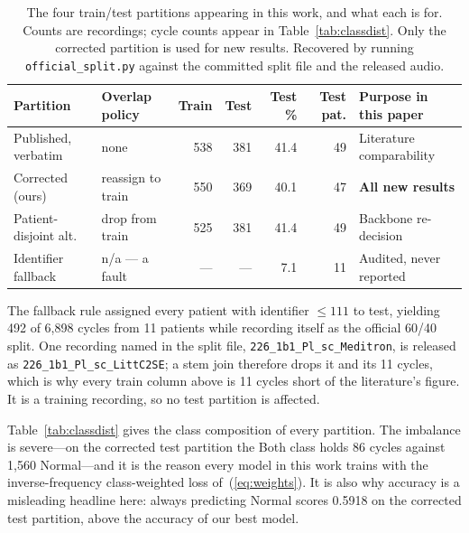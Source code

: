 \documentclass[journal,onecolumn]{IEEEtran}
\newcommand{\best}[1]{\textbf{#1}}
\begin{document}
\begin{table}[!t]
\centering
\caption{The four train/test partitions appearing in this work, and what each is
for. Counts are recordings; cycle counts appear in Table~\ref{tab:classdist}.
Only the corrected partition is used for new results. Recovered by running
\texttt{official\_split.py} against the committed split file and the released
audio.}
\label{tab:splits}
\small
\begin{tabular}{llrrrrl}
\toprule
Partition & Overlap policy & Train & Test & Test \% & Test pat. & Purpose in this paper \\
\midrule
Published, verbatim   & none                 & 538 & 381 & 41.4 & 49 & Literature comparability \\
Corrected (ours)      & reassign to train    & 550 & 369 & 40.1 & 47 & \best{All new results} \\
Patient-disjoint alt. & drop from train      & 525 & 381 & 41.4 & 49 & Backbone re-decision \\
Identifier fallback   & n/a --- a fault      & --- & --- & \phantom{0}7.1 & 11 & Audited, never reported \\
\bottomrule
\end{tabular}

\vspace{2pt}
\footnotesize The fallback rule assigned every patient with identifier
$\leq111$ to test, yielding 492 of 6{,}898 cycles from 11 patients while
recording itself as the official 60/40 split. One recording named in the split
file, \texttt{226\_1b1\_Pl\_sc\_Meditron}, is released as
\texttt{226\_1b1\_Pl\_sc\_LittC2SE}; a stem join therefore drops it and its 11
cycles, which is why every train column above is 11 cycles short of the
literature's figure. It is a training recording, so no test partition is affected.
\end{table}

Table~\ref{tab:classdist} gives the class composition of every partition. The
imbalance is severe---on the corrected test partition the Both class holds 86
cycles against 1{,}560 Normal---and it is the reason every model in this work
trains with the inverse-frequency class-weighted loss of~(\ref{eq:weights}). It is
also why accuracy is a misleading headline here: always predicting Normal scores
0.5918 on the corrected test partition, above the accuracy of our best model.
\end{document}
